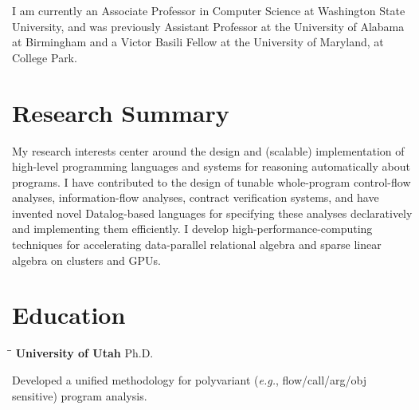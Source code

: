 \documentclass[line]{res}
\begin{document}

\address{\bf gilray.org
\ \ \ \ \ \ \ \ }
                                  
\begin{resume}        

\vspace{-0.1in}  
I am currently an Associate Professor in Computer Science at Washington State University, and was previously Assistant Professor at the University of Alabama at Birmingham and a Victor Basili Fellow at the University of Maryland, at College Park.

\section{\large Research Summary} \vspace{0.1cm}   
My research interests center around the design and (scalable) implementation of high-level programming languages and systems for reasoning automatically about programs. I have contributed to the design of tunable whole-program control-flow analyses, information-flow analyses, contract verification systems, and have invented novel Datalog-based languages for specifying these analyses declaratively and implementing them efficiently. I develop high-performance-computing techniques for accelerating data-parallel relational algebra and sparse linear algebra on clusters and GPUs.

\section{\large Education}          
    \vspace{-0.1cm}	
    \begin{tabbing}
    \hspace{2.25in}\= \hspace{2.25in}\= \kill %
    {\bf University of Utah} \>Ph.D.     
    \end{tabbing}\vspace{-0.5cm}
    Developed a unified methodology for polyvariant (\textit{e.g.}, flow/call/arg/obj sensitive) program analysis.%
    

\end{resume}
\end{document}
